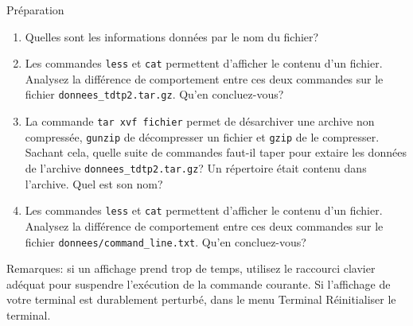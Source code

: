 \begin{exercice}
  \begin{exercicelet}{Préparation}
    \begin{enumerate}\setcounter{enumi}{\value{cnti}}
    \item Quelles sont les informations données par le nom du fichier?
    \item Les commandes \texttt{less} et \texttt{cat} permettent
      d'afficher le contenu d'un fichier. Analysez la différence de
      comportement entre ces deux commandes sur le fichier
      \verb|donnees_tdtp2.tar.gz|. Qu'en concluez-vous?
    \item La commande \verb|tar xvf fichier| permet de désarchiver une
      archive non compressée, \texttt{gunzip} de décompresser un fichier
      et \texttt{gzip} de le compresser. Sachant cela, quelle suite de
      commandes faut-il taper pour extaire les données de l'archive
      \verb|donnees_tdtp2.tar.gz|? Un répertoire était contenu dans
      l'archive. Quel est son nom?
    \item Les commandes \texttt{less} et \texttt{cat} permettent
      d'afficher le contenu d'un fichier. Analysez la différence de
      comportement entre ces deux commandes sur le fichier
      \verb|donnees/command_line.txt|. Qu'en concluez-vous?
      \setcounter{cnti}{\value{enumi}}
    \end{enumerate}
    
    Remarques: si un affichage prend trop de temps, utilisez le
    raccourci clavier adéquat pour suspendre l'exécution de la commande
    courante.  Si l'affichage de votre terminal est durablement
    perturbé, dans le menu Terminal \textrightarrow Réinitialiser le
    terminal.
  \end{exercicelet}
\end{exercice}
